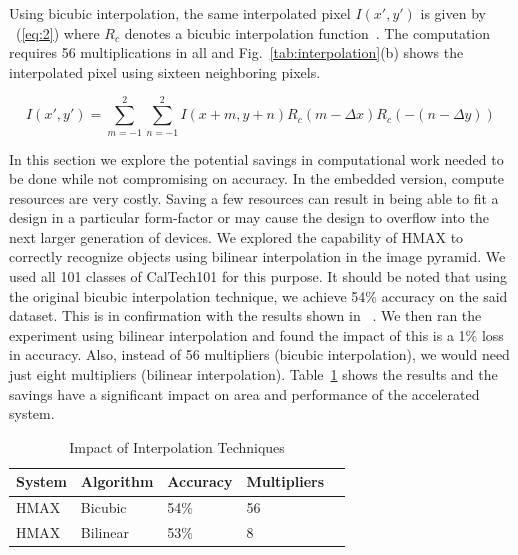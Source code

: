 Using bicubic interpolation, the same interpolated pixel $I(x',y')$ is given by ~(\ref{eq:2}) where 
$R_c$ denotes a bicubic interpolation function~\cite{Keys}. The computation requires 56 multiplications in all and Fig.~\ref{tab:interpolation}(b) shows the interpolated pixel 
using sixteen neighboring pixels.

{
\begin{equation}
I(x',y')=\sum_{m=-1}^{2}\sum_{n=-1}^{2}I(x+m,y+n)R_c(m-\Delta x)R_c(-(n-\Delta y))
\label{eq:2}
\end{equation}
}

In this section we explore the potential savings in computational work needed to be done while not compromising on accuracy. 
In the embedded version, compute resources are very costly. Saving a few resources can result in being able to 
fit a design in a particular form-factor or may cause the design to overflow into the next larger generation of devices. We explored the 
capability of HMAX to correctly recognize objects using bilinear interpolation in the image pyramid. We used all 101 classes of CalTech101 
for this purpose. It should be noted that using the original bicubic interpolation technique, we achieve 54\% accuracy on the said dataset. This is in confirmation with the results shown in ~\cite{Mutch2008}. 
We then ran the experiment using bilinear interpolation and found the impact of this is a 1\% loss in accuracy. Also, instead of 
56 multipliers (bicubic interpolation), we would need just eight multipliers (bilinear interpolation). Table~\ref{table:compute} shows the 
results and the savings have a significant impact on area and performance of the accelerated system. 

\begin{table}[h]
\renewcommand{\arraystretch}{1.3}
\caption {Impact of Interpolation Techniques}
\label{table:compute}
\centering
\begin{tabular}{lllll}
 System & Algorithm & Accuracy & Multipliers\\\hline
 HMAX	& Bicubic   & 54\% & 56\\\hline
 HMAX   & Bilinear  & 53\% & 8\\\hline
\end{tabular}
\end{table}
